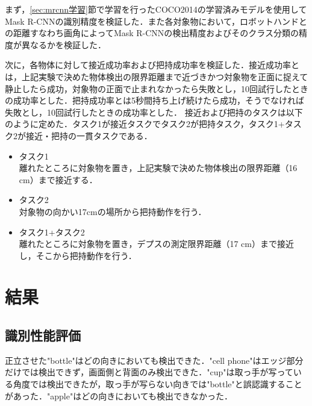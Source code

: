 まず，\ref{sec:mrcnn学習}節で学習を行ったCOCO2014の学習済みモデルを使用してMask R-CNNの識別精度を検証した．また各対象物において，ロボットハンドとの距離すなわち画角によってMask R-CNNの検出精度およびそのクラス分類の精度が異なるかを検証した．

次に，各物体に対して接近成功率および把持成功率を検証した．接近成功率とは，上記実験で決めた物体検出の限界距離まで近づきかつ対象物を正面に捉えて静止したら成功，対象物の正面で止まれなかったら失敗とし，10回試行したときの成功率とした．把持成功率とは5秒間持ち上げ続けたら成功，そうでなければ失敗とし，10回試行したときの成功率とした．
接近および把持のタスクは以下のように定めた．タスク1が接近タスクでタスク2が把持タスク，タスク1+タスク2が接近・把持の一貫タスクである．
\begin{itemize}
    \item タスク1\\
    離れたところに対象物を置き，上記実験で決めた物体検出の限界距離（16 cm）まで接近する．
    \item タスク2\\
    対象物の向かい17cmの場所から把持動作を行う．
    \item タスク1+タスク2\\
    離れたところに対象物を置き，デプスの測定限界距離（17 cm）まで接近し，そこから把持動作を行う．
\end{itemize}


\section{結果}
\subsection{識別性能評価}
正立させた"bottle"はどの向きにおいても検出できた．"cell phone"はエッジ部分だけでは検出できず，画面側と背面のみ検出できた．"cup"は取っ手が写っている角度では検出できたが，取っ手が写らない向きでは"bottle"と誤認識することがあった．"apple"はどの向きにおいても検出できなかった．

